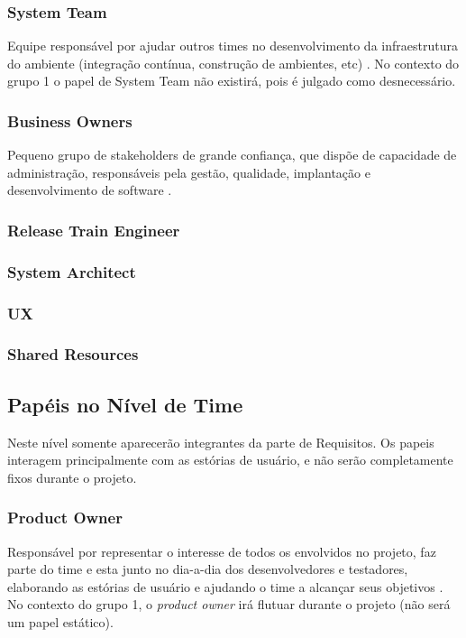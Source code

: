 \subsubsection{System Team}
Equipe responsável por ajudar outros times no desenvolvimento da infraestrutura do ambiente (integração contínua, construção de ambientes, etc) \cite{safesite003}. No contexto do grupo 1 o papel de System Team não existirá, pois é julgado como desnecessário.

\subsubsection{Business Owners}
Pequeno grupo de stakeholders de grande confiança, que dispõe de capacidade de administração, responsáveis pela gestão, qualidade, implantação e desenvolvimento de software \cite{safesite004}.

\subsubsection{Release Train Engineer}
\subsubsection{System Architect}
\subsubsection{UX}
\subsubsection{Shared Resources}

\subsection{Papéis no Nível de Time}
Neste nível somente aparecerão integrantes da parte de Requisitos. Os papeis interagem principalmente com as estórias de usuário, e não serão completamente fixos durante o projeto.

\subsubsection{Product Owner}
Responsável por representar o interesse de todos os envolvidos no projeto, faz parte do time e esta junto no dia-a-dia dos desenvolvedores e testadores, elaborando as estórias de usuário e ajudando o time a alcançar seus objetivos \cite{safe008}. No contexto do grupo 1, o \emph{product owner} irá flutuar durante o projeto (não será um papel estático).

